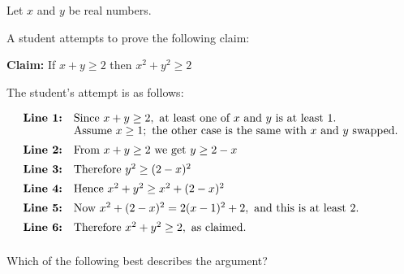 \documentclass[11pt,a4paper]{article}
\begin{document}
\thispagestyle{djspaper}
\djsFrontMatter
\thispagestyle{djspaper}
\vspace*{8pt}
\begin{enumerate}[label=\textbf{\arabic*.},leftmargin=*,itemsep=0pt,start=1]

Let $x$ and $y$ be real numbers.

A student attempts to prove the following claim: \begin{center}
\begin{minipage}{0.82\linewidth}
\centering
\textbf{Claim:} If $x+y\geq2$ then $x^2+y^2\ge 2$
\end{minipage}
\end{center} The student's attempt is as follows:

\[
\begin{array}{@{}rl@{}}
\textbf{Line 1:} &
\text{Since }x+y\ge2,\text{ at least one of }x\text{ and }y\text{ is at least }1. \\[-1pt]
&
\text{Assume }x\ge1;\text{ the other case is the same with }x\text{ and }y\text{ swapped.} \\[5pt]

\textbf{Line 2:} &
\text{From }x+y\ge2\text{ we get }y\ge2-x \\[5pt]

\textbf{Line 3:} &
\text{Therefore }y^2\ge(2-x)^2 \\[5pt]

\textbf{Line 4:} &
\text{Hence }x^2+y^2\ge x^2+(2-x)^2 \\[5pt]

\textbf{Line 5:} &
\text{Now }x^2+(2-x)^2=2(x-1)^2+2,\text{ and this is at least }2. \\[5pt]

\textbf{Line 6:} &
\text{Therefore }x^2+y^2\ge2,\text{ as claimed.}\\[5pt]
\end{array}
\]


Which of the following best describes the argument?


\end{enumerate}
\end{document}
